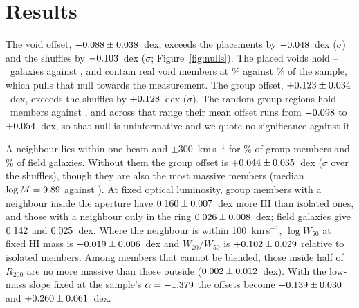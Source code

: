 \documentclass[twocolumn]{aastex631}
\begin{document}
\section{Results}
\label{sec:results}
The void offset, $-0.088\pm0.038$~dex, exceeds the placements by
$-0.048$~dex (\feRealEnvVoidQuadSigma$\sigma$) and the shuffles by
$-0.103$~dex (\feRealShufVoidEnvSigma$\sigma$; Figure~\ref{fig:nulls}). The
placed voids hold \feRealEnvPlaceVoidOccLo--\feRealEnvPlaceVoidOccHi\ galaxies against
\feRealNInVoid, and contain real void members at \feRealNullCOverlap\% against
\feRealVoidBaseRatePct\% of the sample, which pulls that null towards the measurement. The group
offset, $+0.123\pm0.034$~dex, exceeds the shuffles by
$+0.128$~dex (\feRealShufGroupEnvSigma$\sigma$). The random group regions hold
\feRealEnvPlaceGroupOccLo--\feRealEnvPlaceGroupOccHi\ members against \feRealGroupNInGroupReal, and
across that range their mean offset runs from $-0.098$ to
$+0.054$~dex, so that null is uninformative and we quote no significance
against it.

A neighbour lies within one beam and $\pm300$~km\,s$^{-1}$ for \feRealBlendGroupFixedFlagIn\% of
group members and \feRealBlendGroupFixedFlagOut\% of field galaxies. Without them the group
offset is $+0.044\pm0.035$~dex
(\feRealBlendGroupFixedShufSigma$\sigma$ over the shuffles), though they are also the most massive
members (median $\log M=9.89$ against \feRealBlendGroupFixedLogMClean).
At fixed optical luminosity, group members with a neighbour inside the aperture have
$0.160\pm0.007$~dex more HI than isolated ones,
and those with a neighbour only in the ring $0.026\pm0.008$~dex;
field galaxies give $0.142$ and $0.025$~dex.
Where the neighbour is within 100~km\,s$^{-1}$, $\log W_{50}$ at fixed HI mass is
$-0.019\pm0.006$~dex and $W_{20}/W_{50}$ is
$+0.102\pm0.029$ relative to isolated
members. Among members that cannot be blended, those inside half of $R_{200}$ are no more massive than
those outside ($0.002\pm0.012$~dex). With the low-mass slope
fixed at the sample's $\alpha=-1.379$ the offsets become
$-0.139\pm0.030$ and
$+0.260\pm0.061$~dex.
\end{document}
